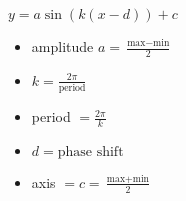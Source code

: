 \documentclass[../main.tex]{subfiles}
\begin{document}
$y=a\sin(k(x-d))+c$

\begin{itemize}
    \item amplitude $a = \frac{\text{max}-\text{min}}{2}$
    \item $k=\frac{2\pi}{\text{period}}$
    \item period $=\frac{2\pi}{k}$
    \item $d=\text{phase shift}$
    \item axis $=c=\frac{\text{max}+\text{min}}{2}$
\end{itemize}
\end{document}
